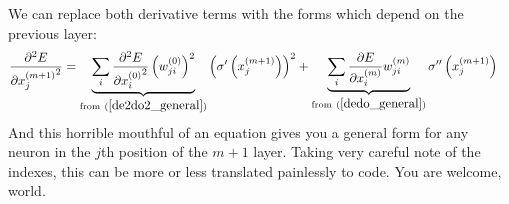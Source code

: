 We can replace both derivative terms with the forms which depend on the previous layer:
\begin{align}
\pdv[2]{E}{{x_{j}^{(m+1)}}} &= 
\underbrace{\sum_i\pdv[2]{E}{{x_{i}^{(0)}}} \left({w_{ji}^{(0)}}\right)^2}
_{\text{from} \ (\ref{de2do2_general})}
\left(\sigma^{\prime}\left({x_{j}^{(m+1)}}\right)\right)^2
+
\underbrace{\sum_i\pdv{E}{x_{i}^{(m)}}w_{ji}^{(m)}}
_{\text{from} \ (\ref{dedo_general})}
\sigma^{\prime\prime}\left(x_{j}^{(m+1)}\right)
\end{align}
And this horrible mouthful of an equation gives you a general form for any neuron in the $j$th position of the $m+1$ layer. Taking very careful note of the indexes, this can be more or less translated painlessly to code. You are welcome, world. 